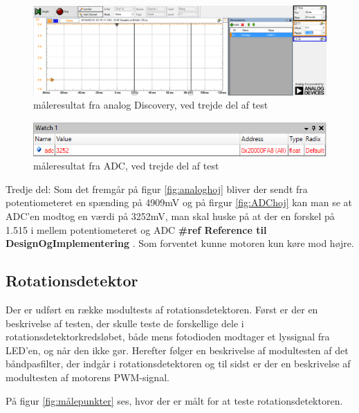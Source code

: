 \begin{figure}[H]
	\centering
	\includegraphics[width=\textwidth]{test/images/ModultestADC/4904mVanalog}
	\caption{måleresultat fra analog Discovery, ved trejde del af test}
	\label{figure:analoghoj}
\end{figure}
\begin{figure}[H]
	\centering
	\includegraphics[width=\textwidth]{test/images/ModultestADC/opDebug}
	\caption{måleresultat fra ADC, ved trejde del af test}
	\label{figure: ADChoj}
\end{figure}
Tredje del: Som det fremgår på figur \ref{fig:analoghoj} bliver der sendt fra potentiometeret en spænding på 4909mV og på firgur \ref{fig:ADChoj}  kan man se at ADC’en modtog en værdi på 3252mV, man skal huske på at der en forskel på 1.515 i mellem potentiometeret og ADC \textbf{\#ref Reference til DesignOgImplementering }. 
Som forventet kunne motoren kun køre mod højre.


\subsection{Rotationsdetektor}
Der er udført en række modultests af rotationsdetektoren. Først er der en beskrivelse af testen, der skulle teste de forskellige dele i rotationsdetektorkredsløbet, både mens fotodioden modtager et lyssignal fra LED'en, og når den ikke gør. Herefter følger en beskrivelse af modultesten af det båndpasfilter, der indgår i rotationsdetektoren og til sidst er der en beskrivelse af modultesten af motorens PWM-signal. 

På figur \ref{fig:målepunkter} ses, hvor der er målt for at teste rotationsdetektoren. 

